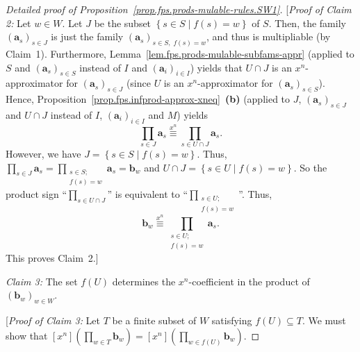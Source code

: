 \begin{proof}[Detailed proof of Proposition~\ref{prop.fps.prods-mulable-rules.SW1}]
[\emph{Proof of Claim 2:} Let $w \in W$. Let $J$ be the subset
$\left\{s \in S \mid f(s) = w\right\}$ of $S$. Then, the family
$\left(\mathbf{a}_{s}\right)_{s \in J}$ is just the family
$\left(\mathbf{a}_{s}\right)_{s \in S,\; f(s) = w}$, and thus is
multipliable (by Claim~1). Furthermore,
Lemma~\ref{lem.fps.prods-mulable-subfams-appr} (applied to $S$ and
$\left(\mathbf{a}_{s}\right)_{s \in S}$ instead of $I$ and
$\left(\mathbf{a}_{i}\right)_{i \in I}$) yields that $U \cap J$ is an
$x^n$-approximator for $\left(\mathbf{a}_{s}\right)_{s \in J}$ (since
$U$ is an $x^n$-approximator for
$\left(\mathbf{a}_{s}\right)_{s \in S}$). Hence,
Proposition~\ref{prop.fps.infprod-approx-xneq}~\textbf{(b)} (applied to
$J$, $\left(\mathbf{a}_{s}\right)_{s \in J}$ and $U \cap J$ instead of
$I$, $\left(\mathbf{a}_{i}\right)_{i \in I}$ and $M$) yields
\[
\prod_{s \in J} \mathbf{a}_{s} \overset{x^n}{\equiv}
\prod_{s \in U \cap J} \mathbf{a}_{s}.
\]
However, we have $J = \left\{s \in S \mid f(s) = w\right\}$. Thus,
$\prod_{s \in J} \mathbf{a}_{s}
= \prod_{\substack{s \in S;\\ f(s) = w}} \mathbf{a}_{s} = \mathbf{b}_w$
and $U \cap J = \left\{s \in U \mid f(s) = w\right\}$. So the product
sign ``$\prod_{s \in U \cap J}$'' is equivalent to
``$\prod_{\substack{s \in U;\\ f(s) = w}}$''. Thus,
\[
\mathbf{b}_{w} \overset{x^n}{\equiv}
\prod_{\substack{s \in U;\\ f(s) = w}} \mathbf{a}_{s}.
\]
This proves Claim~2.]

\emph{Claim 3:} The set $f(U)$ determines the $x^n$-coefficient in the
product of $\left(\mathbf{b}_{w}\right)_{w \in W}$.

[\emph{Proof of Claim 3:} Let $T$ be a finite subset of $W$ satisfying
$f(U) \subseteq T$. We must show that
$\left[x^n\right] \left(\prod_{w \in T} \mathbf{b}_w\right)
= \left[x^n\right] \left(\prod_{w \in f(U)} \mathbf{b}_w\right)$.


\end{proof}
